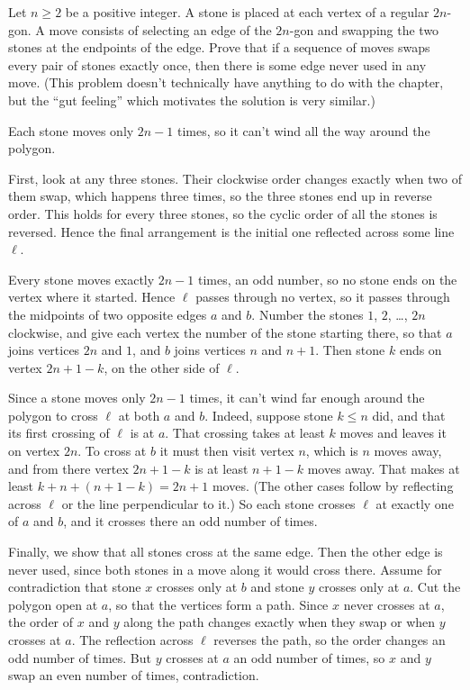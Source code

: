 \begin{problem}
	[RMM 2013] \twochili
	Let $n \ge 2$ be a positive integer.
	A stone is placed at each vertex of a regular $2n$-gon.
	A move consists of selecting an edge of the $2n$-gon and swapping the two stones at the endpoints of the edge.
	Prove that if a sequence of moves swaps every pair of stones exactly once, then there is some edge never used in any move.
	(This problem doesn't technically have anything to do with the chapter,
	but the ``gut feeling'' which motivates the solution is very similar.)
	\begin{hint}
		Each stone moves only $2n-1$ times,
		so it can't wind all the way around the polygon.
	\end{hint}
	\begin{sol}
		First, look at any three stones.
		Their clockwise order changes exactly when two of them swap,
		which happens three times,
		so the three stones end up in reverse order.
		This holds for every three stones,
		so the cyclic order of all the stones is reversed.
		Hence the final arrangement is the initial one
		reflected across some line $\ell$.

		Every stone moves exactly $2n-1$ times, an odd number,
		so no stone ends on the vertex where it started.
		Hence $\ell$ passes through no vertex,
		so it passes through the midpoints
		of two opposite edges $a$ and $b$.
		Number the stones $1$, $2$, \dots, $2n$ clockwise,
		and give each vertex the number of the stone starting there,
		so that $a$ joins vertices $2n$ and $1$,
		and $b$ joins vertices $n$ and $n+1$.
		Then stone $k$ ends on vertex $2n+1-k$,
		on the other side of $\ell$.

		Since a stone moves only $2n-1$ times,
		it can't wind far enough around the polygon
		to cross $\ell$ at both $a$ and $b$.
		Indeed, suppose stone $k \le n$ did,
		and that its first crossing of $\ell$ is at $a$.
		That crossing takes at least $k$ moves
		and leaves it on vertex $2n$.
		To cross at $b$ it must then visit vertex $n$,
		which is $n$ moves away,
		and from there vertex $2n+1-k$ is at least $n+1-k$ moves away.
		That makes at least $k + n + (n+1-k) = 2n+1$ moves.
		(The other cases follow by reflecting
		across $\ell$ or the line perpendicular to it.)
		So each stone crosses $\ell$ at exactly one of $a$ and $b$,
		and it crosses there an odd number of times.

		Finally, we show that all stones cross at the same edge.
		Then the other edge is never used,
		since both stones in a move along it would cross there.
		Assume for contradiction that stone $x$ crosses only at $b$
		and stone $y$ crosses only at $a$.
		Cut the polygon open at $a$, so that the vertices form a path.
		Since $x$ never crosses at $a$,
		the order of $x$ and $y$ along the path changes
		exactly when they swap or when $y$ crosses at $a$.
		The reflection across $\ell$ reverses the path,
		so the order changes an odd number of times.
		But $y$ crosses at $a$ an odd number of times,
		so $x$ and $y$ swap an even number of times, contradiction.
	\end{sol}
\end{problem}


